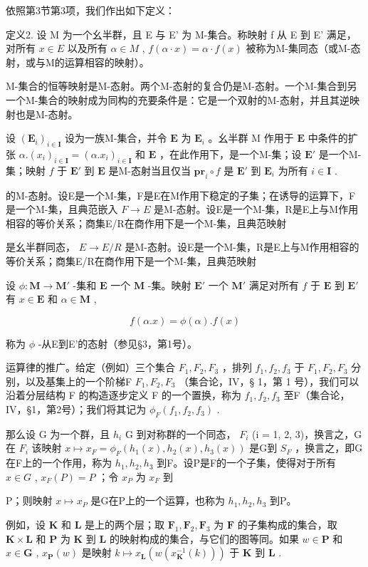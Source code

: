 依照第3节第3项，我们作出如下定义：

定义2. 设 M 为一个幺半群，且 E 与 E' 为 M-集合。称映射 f 从 E 到 E' 满足，对所有 \(x \in E\) 以及所有 \(\alpha \in M\) , \(f(\alpha \cdot x) = \alpha \cdot f(x)\) 被称为M-集同态（或M-态射，或与M的运算相容的映射）。

M-集合的恒等映射是M-态射。两个M-态射的复合仍是M-态射。一个M-集合到另一个M-集合的映射成为同构的充要条件是：它是一个双射的M-态射，并且其逆映射也是M-态射。

设 \((\mathbf{E}_i)_{i\in \mathbf{I}}\) 设为一族M-集合，并令 \(\mathbf{E}\) 为 \(\mathbf{E}_i\) 。幺半群 M 作用于 \(\mathbf{E}\) 中条件的扩张 \(\alpha .(x_i)_{i\in \mathbf{I}} = (\alpha .x_i)_{i\in \mathbf{I}}\) 和 \(\mathbf{E}\) ，在此作用下，是一个M-集；设 \(\mathbf{E}'\) 是一个M-集；映射 \(f\) 于 \(\mathbf{E}'\) 到 \(\mathbf{E}\) 是M-态射当且仅当 \(\mathbf{pr}_i\circ f\) 是 \(\mathbf{E}'\) 到 \(\mathbf{E}_i\) 为所有 \(i\in \mathbf{I}\) .

的M-态射。设E是一个M-集，F是E在M作用下稳定的子集；在诱导的运算下，F是一个M-集，且典范嵌入 \(F \rightarrow E\) 是M-态射。设E是一个M-集，R是E上与M作用相容的等价关系；商集E/R在商作用下是一个M-集，且典范映射

是幺半群同态， \(E \rightarrow E/R\) 是M-态射。设E是一个M-集，R是E上与M作用相容的等价关系；商集E/R在商作用下是一个M-集，且典范映射

设 \(\phi: \mathbf{M} \to \mathbf{M}'\) -集和 \(\mathbf{E}\) 一个 \(\mathbf{M}\) -集。映射 \(\mathbf{E}'\) 一个 \(\mathbf{M}'\) 满足对所有 \(f\) 于 \(\mathbf{E}\) 到 \(\mathbf{E}'\) 有 \(x \in \mathbf{E}\) 和 \(\alpha \in \mathbf{M}\) ,

\[
f (\alpha . x) = \phi (\alpha). f (x)
\]

称为 \(\phi\) -从E到E'的态射（参见§3，第1号）。

运算律的推广。给定（例如）三个集合 \(F_{1}, F_{2}, F_{3}\) ，排列 \(f_{1}, f_{2}, f_{3}\) 于 \(F_{1}, F_{2}, F_{3}\) 分别，以及基集上的一个阶梯F \(F_{1}, F_{2}, F_{3}\) （集合论，IV，§ 1，第 1 号），我们可以沿着分层结构 F 的构造逐步定义 F 的一个置换，称为 \(f_{1}, f_{2}, f_{3}\) 至F（集合论，IV，§1，第2号）；我们将其记为 \(\phi_{F}(f_{1}, f_{2}, f_{3})\) .

那么设 G 为一个群，且 \(h_{i}\) G 到对称群的一个同态， \(F_{i}\) (i = 1, 2, 3)，换言之，G 在 \(F_{i}\) 该映射 \(x \mapsto x_{F} = \phi_{F}(h_{1}(x), h_{2}(x), h_{3}(x))\) 是G到 \(S_{F}\) ，换言之，即G在F上的一个作用，称为 \(h_{1}, h_{2}, h_{3}\) 到F。设P是F的一个子集，使得对于所有 \(x \in G\) , \(x_{F}(P) = P\) ；令 \(x_{P}\) 为 \(x_{F}\) 到

P；则映射 \(x \mapsto x_{P}\) 是G在P上的一个运算，也称为 \(h_{1}, h_{2}, h_{3}\) 到P。

例如，设 \(\mathbf{K}\) 和 \(\mathbf{L}\) 是上的两个层；取 \(\mathbf{F}_1, \mathbf{F}_2, \mathbf{F}_3\) 为 \(\mathbf{F}\) 的子集构成的集合，取 \(\mathbf{K} \times \mathbf{L}\) 和 \(\mathbf{P}\) 为 \(\mathbf{K}\) 到 \(\mathbf{L}\) 的映射构成的集合，与它们的图等同。如果 \(w \in \mathbf{P}\) 和 \(x \in \mathbf{G}\) , \(x_{\mathbf{P}}(w)\) 是映射 \(k \mapsto x_{\mathbf{L}}(w(x_{\mathbf{K}}^{-1}(k)))\) 于 \(\mathbf{K}\) 到 \(\mathbf{L}\) .

